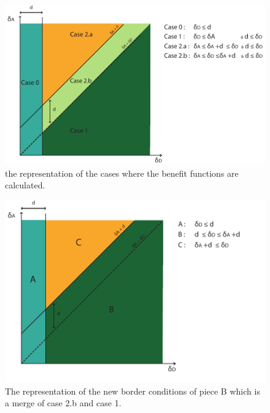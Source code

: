 \begin{figure}[hbtp]
\centering
\includegraphics[scale=0.7]{Images/borders.pdf}
\caption{the representation of the cases where the benefit functions are calculated.}
\label{Borders}
\end{figure}

\begin{figure}[hbtp]
\centering
\includegraphics[scale=0.7]{Images/defborders.pdf}
\caption{The representation of the new border conditions of piece B which is a merge of case 2.b and case 1.}
\label{endborders}
\end{figure}


